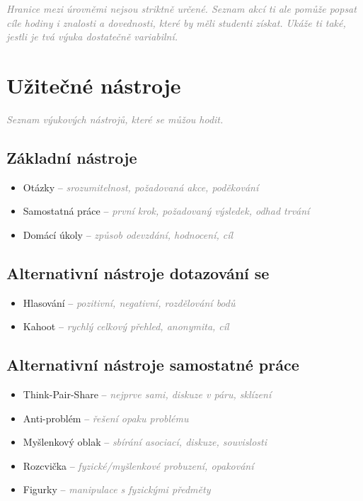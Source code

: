 \documentclass[twoside,openany]{book}
\newcommand{\note}[1]{\textcolor{gray}{\small\itshape #1}}
\begin{document}
\note{Hranice mezi úrovněmi nejsou striktně určené. Seznam akcí ti ale pomůže popsat cíle hodiny i znalosti a dovednosti, které by měli studenti získat. Ukáže ti také, jestli je tvá výuka dostatečně variabilní.}

\chapter*{Užitečné nástroje}

\note{Seznam výukových nástrojů, které se můžou hodit.}

\section*{Základní nástroje}
\begin{itemize}
\item Otázky -- \note{srozumitelnost, požadovaná akce, poděkování}
\item Samostatná práce -- \note{první krok, požadovaný výsledek, odhad trvání}
\item Domácí úkoly -- \note{způsob odevzdání, hodnocení, cíl}
\end{itemize}

\section*{Alternativní nástroje dotazování se}
\begin{itemize}
\item Hlasování -- \note{pozitivní, negativní, rozdělování bodů}
\item Kahoot -- \note{rychlý celkový přehled, anonymita, cíl}
\end{itemize}

\section*{Alternativní nástroje samostatné práce}
\begin{itemize}
\item Think-Pair-Share -- \note{nejprve sami, diskuze v páru, sklízení}
\item Anti-problém -- \note{řešení opaku problému}
\item Myšlenkový oblak -- \note{sbírání asociací, diskuze, souvislosti}
\item Rozcvička -- \note{fyzické/myšlenkové probuzení, opakování}
\item Figurky -- \note{manipulace s fyzickými předměty}
\end{itemize}
\end{document}
